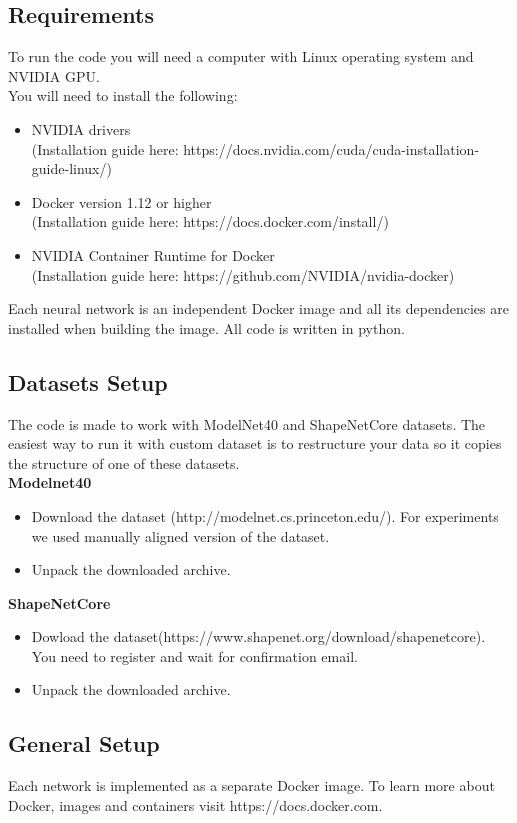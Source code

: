 \subsection{Requirements}
To run the code you will need a computer with Linux operating system and NVIDIA GPU. \\

You will need to install the following:
\begin{itemize}
	\item NVIDIA drivers \\(Installation guide here: https://docs.nvidia.com/cuda/cuda-installation-guide-linux/)
	\item Docker version 1.12 or higher \\(Installation guide here: https://docs.docker.com/install/)
	\item NVIDIA Container Runtime for Docker \\(Installation guide here: https://github.com/NVIDIA/nvidia-docker)
\end{itemize}
Each neural network is an independent Docker image and all its dependencies are installed when building the image. All code is written in python.  

\subsection{Datasets Setup}
The code is made to work with ModelNet40 and ShapeNetCore datasets. The easiest way to run it with custom dataset is to restructure your data so it copies the structure of one of these datasets.\\
\textbf{Modelnet40}
\begin{itemize}
	\item {Download the dataset (http://modelnet.cs.princeton.edu/). For experiments we used manually aligned version of the dataset.}
	\item{Unpack the downloaded archive.}
\end{itemize}
\textbf{ShapeNetCore}
\begin{itemize}
		\item {Dowload the dataset(https://www.shapenet.org/download/shapenetcore). You need to register and wait for confirmation email.}
	\item{Unpack the downloaded archive.}
\end{itemize}

\subsection{General Setup}
Each network is implemented as a separate Docker image. To learn more about Docker, images and containers visit https://docs.docker.com.

